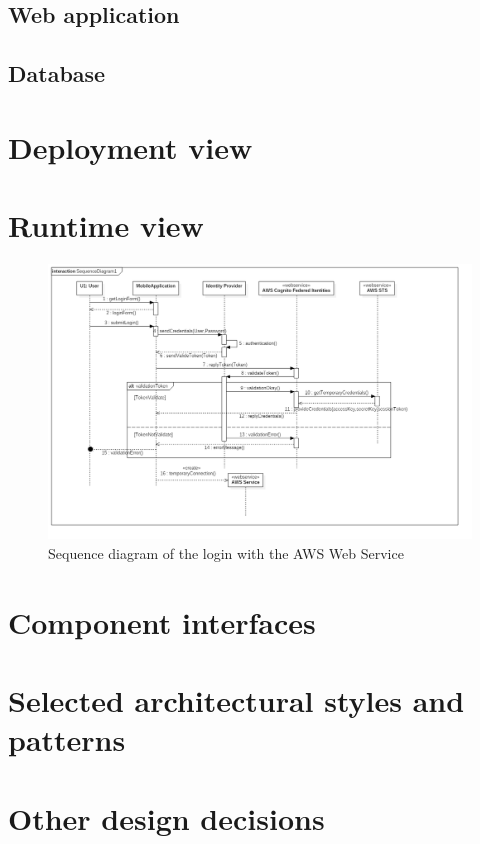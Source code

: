 \subsection*{Web application}

\subsection*{Database}

\section{Deployment view}
\label{sec:depl_view}

\section{Runtime view}
\label{sec:runtime_view}

\begin{figure}
	\centering
	\includegraphics[width=6in]{./diagrams/SequenceDiagramLogin.png}
	\caption{Sequence diagram of the login with the AWS Web Service}
	\label{fig:seqLogin}
\end{figure}

\section{Component interfaces}
\label{sec:runtime_view}

\section{Selected architectural styles and patterns}
\label{sec:archs}

\section{Other design decisions}
\label{sec:des_dec}